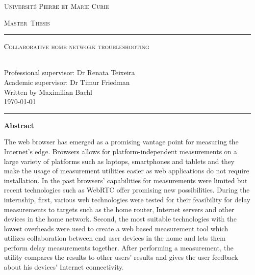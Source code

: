 \documentclass[12pt,twoside]{book}
\renewcommand{\title}{Collaborative home network troubleshooting}
\renewcommand{\author}{Maximilian Bachl}
\begin{document}
\begin{titlepage}
\begin{center}
{\Huge \textsc{Université Pierre et Marie Curie}\par}
\vspace{0.25cm}
{\fontsize{2.5cm}{2cm}\selectfont \textsc{Master\ Thesis}\par}
\vspace{1cm}	
\hrule
\vspace{0.3cm}
{\Huge \textsc{\title{}}\par}
~\\
{\Large Professional supervisor: Dr Renata Teixeira}\\[0.1cm]
{\Large Academic supervisor: Dr Timur Friedman}\\[0.3cm]
{\Large Written by \author{}}\\[0.1cm]
{\Large \today}
\vspace{0.55cm}
\hrule
\end{center}
\vfill
\begin{center}{\Large\textbf{Abstract}}\end{center}
The web browser has emerged as a promising vantage point for measuring the Internet's edge. Browsers allows for platform-independent measurements on a large variety of platforms such as laptops, smartphones and tablets and they make the usage of measurement utilities easier as web applications do not require installation. In the past browsers' capabilities for measurements were limited but recent technologies such as WebRTC offer promising new possibilities. During the internship, first, various web technologies were tested for their feasibility for delay measurements to targets such as the home router, Internet servers and other devices in the home network. Second, the most suitable technologies with the lowest overheads were used to create a web based measurement tool which utilizes collaboration between end user devices in the home and lets them perform delay measurements together. After performing a measurement, the utility compares the results to other users' results and gives the user feedback about his devices' Internet connectivity. 
\end{titlepage}

\end{document}

